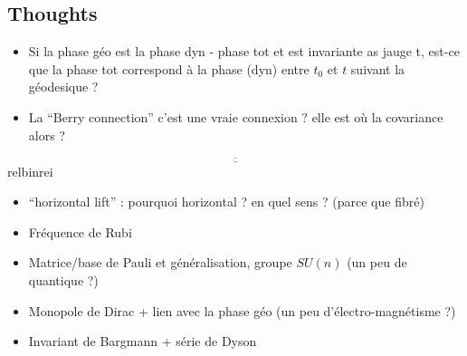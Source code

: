 \subsection{Thoughts}

\begin{itemize}
	\item Si la phase géo est la phase dyn - phase tot et est invariante as jauge t, est-ce que la phase tot correspond à la phase (dyn) entre $t_0$ et $t$ suivant la géodesique ?
	
	\item La ``Berry connection'' c'est une vraie connexion ? elle est où la covariance alors ?
\end{itemize}

\[\underline{\overline{\qquad\qquad\qquad\qquad\qquad\qquad\qquad\qquad\qquad\qquad\qquad\qquad\qquad\qquad\qquad\qquad\qquad\qquad}}\]{\color{white}relbinrei}

\begin{itemize}
	\item ``horizontal lift'' : pourquoi horizontal ? en quel sens ? (parce que fibré)
	
	\item Fréquence de Rubi
	
	\item Matrice/base de Pauli et généralisation, groupe $SU(n)$ (un peu de quantique ?)
	
	\item Monopole de Dirac + lien avec la phase géo (un peu d'électro-magnétisme ?)
	
	\item Invariant de Bargmann + série de Dyson
\end{itemize}


\newpage

\listoffigures
\vfill
\lstlistoflistings
\vfill

\newpage

{}

